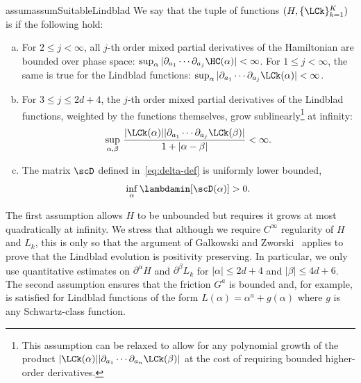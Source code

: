 \documentclass{article}
\numberwithin{equation}{section}
\begin{document}
\begin{restatable}{assum}{assumSuitableLindblad}
    \label{assum:suitableLindblad}
    We say that the tuple of functions 
    $(H,\{\LCk\}_{k=1}^K)$ is  if the following
    hold:
    \begin{enumerate}[a.]
        \item 
        For $2\leq j < \infty$, all $j$-th order mixed partial derivatives of the Hamiltonian are bounded over phase space: $\sup_\alpha |\partial_{a_1}\cdots \partial_{a_j} \HC(\alpha)|<\infty$. For $1\leq j < \infty$, the same is true for the Lindblad functions: $\sup_\alpha |\partial_{a_1}\cdots \partial_{a_j} \LCk(\alpha)|<\infty$.
        \item For $3\leq j\leq 2d+4$, 
        the $j$-th order mixed partial derivatives of the Lindblad functions, weighted by the functions themselves, grow sublinearly\footnote{This assumption can be relaxed to allow for any polynomial growth of the product $|\LCk(\alpha)||\partial_{a_1} \cdots \partial_{a_n} \LCk(\beta)|$ at the cost of requiring bounded higher-order derivatives.} at infinity:
        \begin{align}
        \label{eq:nonlocal-Lk-norm}
            \sup_{\alpha,\beta} \, \frac{|\LCk(\alpha)||\partial_{a_1} \cdots \partial_{a_j} \LCk(\beta)|}{1+|\alpha-\beta|} < \infty.
        \end{align}
        \item The matrix $\scD$ defined in~\eqref{eq:delta-def} is uniformly lower bounded,
        \begin{equation}
            \inf_{\alpha}
            \lambdamin[\scD(\alpha)] > 0.
        \end{equation}
    \end{enumerate}
\end{restatable}
The first assumption allows $H$ to be unbounded but requires it grows at most quadratically at infinity.   We stress that although
we require $C^\infty$ regularity of $H$ and $L_k$, this is 
only so that the argument of Galkowski and Zworski~\cite{galkowski2024classical} applies to prove that the
Lindblad evolution is positivity preserving.  In particular,
we only use quantitative estimates on $\partial^\alpha H$ 
and $\partial^\beta L_k$ for $|\alpha| \leq 2d+4$ and 
$|\beta| \leq 4d+6$.  The second assumption ensures that the friction
$G^a$ is bounded and, for example, is satisfied for Lindblad functions of the form $L(\alpha) = \alpha^a + g(\alpha)$ where $g$ is any Schwartz-class function.
\end{document}
